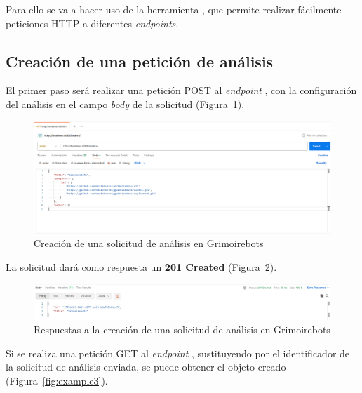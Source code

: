 Para ello se va a hacer uso de la herramienta , que permite realizar fácilmente peticiones HTTP a diferentes \emph{endpoints}.

\subsection{Creación de una petición de análisis}

El primer paso será realizar una petición POST al \emph{endpoint} , con la configuración del análisis en el campo \emph{body} de la solicitud (Figura~\ref{fig:example1}).

\begin{figure}[ht]
    \centering
    \includegraphics[width=\textwidth]{Figures/example1}
    \decoRule
    \caption[Grimoirebots (Creación de análisis)]{Creación de una solicitud de análisis en Grimoirebots}
    \label{fig:example1}
\end{figure}

La solicitud dará como respuesta un \textbf{201 Created} (Figura~\ref{fig:example2}).

\begin{figure}[ht]
    \centering
    \includegraphics[width=\textwidth]{Figures/example2}
    \decoRule
    \caption[Grimoirebots (Respuesta de creación de análisis)]{Respuestas a la creación de una solicitud de análisis en Grimoirebots}
    \label{fig:example2}
\end{figure}

Si se realiza una petición GET al \emph{endpoint} , sustituyendo  por el identificador de la solicitud de análisis enviada, se puede obtener el objeto creado (Figura~\ref{fig:example3}).

